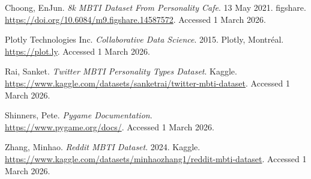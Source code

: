 \documentclass[11pt]{article}
\begin{document}
Choong, EnJun. \textit{8k MBTI Dataset From Personality Cafe}. 13 May 2021. figshare. \\ \url{https://doi.org/10.6084/m9.figshare.14587572}. Accessed 1 March 2026.

Plotly Technologies Inc. \textit{Collaborative Data Science}. 2015. Plotly, Montréal. \\ \url{https://plot.ly}. Accessed 1 March 2026.

Rai, Sanket. \textit{Twitter MBTI Personality Types Dataset}. Kaggle. \\ \url{https://www.kaggle.com/datasets/sanketrai/twitter-mbti-dataset}. Accessed 1 March 2026.

Shinners, Pete. \textit{Pygame Documentation}. \\ \url{https://www.pygame.org/docs/}. Accessed 1 March 2026.

Zhang, Minhao. \textit{Reddit MBTI Dataset}. 2024. Kaggle. \\ \url{https://www.kaggle.com/datasets/minhaozhang1/reddit-mbti-dataset}. Accessed 1 March 2026.
\end{document}

